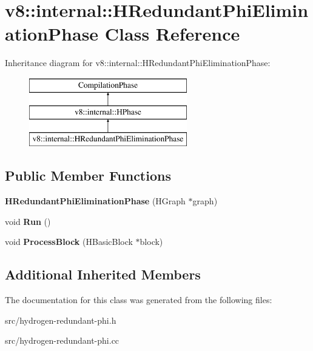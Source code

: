 \hypertarget{classv8_1_1internal_1_1_h_redundant_phi_elimination_phase}{}\section{v8\+:\+:internal\+:\+:H\+Redundant\+Phi\+Elimination\+Phase Class Reference}
\label{classv8_1_1internal_1_1_h_redundant_phi_elimination_phase}
Inheritance diagram for v8\+:\+:internal\+:\+:H\+Redundant\+Phi\+Elimination\+Phase\+:\begin{figure}[H]
\begin{center}
\leavevmode
\includegraphics[height=3.000000cm]{classv8_1_1internal_1_1_h_redundant_phi_elimination_phase}
\end{center}
\end{figure}
\subsection*{Public Member Functions}
\begin{DoxyCompactItemize}
\item 
\hypertarget{classv8_1_1internal_1_1_h_redundant_phi_elimination_phase_a945ae76c5666e27fc0e5fe93390a49c3}{}{\bfseries H\+Redundant\+Phi\+Elimination\+Phase} (H\+Graph $\ast$graph)\label{classv8_1_1internal_1_1_h_redundant_phi_elimination_phase_a945ae76c5666e27fc0e5fe93390a49c3}

\item 
\hypertarget{classv8_1_1internal_1_1_h_redundant_phi_elimination_phase_a2192fc7bbf79aa3a97c4f07c472c85fa}{}void {\bfseries Run} ()\label{classv8_1_1internal_1_1_h_redundant_phi_elimination_phase_a2192fc7bbf79aa3a97c4f07c472c85fa}

\item 
\hypertarget{classv8_1_1internal_1_1_h_redundant_phi_elimination_phase_a84e9bfcc9c7e075b8e90a5178ee7e765}{}void {\bfseries Process\+Block} (H\+Basic\+Block $\ast$block)\label{classv8_1_1internal_1_1_h_redundant_phi_elimination_phase_a84e9bfcc9c7e075b8e90a5178ee7e765}

\end{DoxyCompactItemize}
\subsection*{Additional Inherited Members}


The documentation for this class was generated from the following files\+:\begin{DoxyCompactItemize}
\item 
src/hydrogen-\/redundant-\/phi.\+h\item 
src/hydrogen-\/redundant-\/phi.\+cc\end{DoxyCompactItemize}
